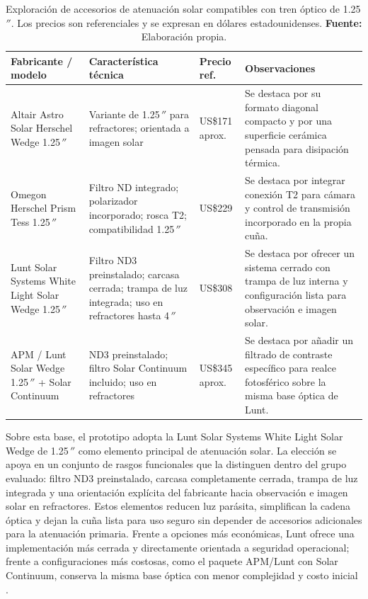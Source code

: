 \begin{table}[H]
\centering
\caption{Exploración de accesorios de atenuación solar compatibles con tren óptico de 1.25\,$''$. Los precios son referenciales y se expresan en dólares estadounidenses. \textbf{Fuente:} Elaboración propia.}
\label{tab:comparacion_filtros_proyecto}
\uniformtablestyle
\begin{tabularx}{\textwidth}{>{\raggedright\arraybackslash}p{3.35cm} >{\raggedright\arraybackslash}p{3.15cm} >{\centering\arraybackslash}p{1.45cm} X}
\toprule
\textbf{Fabricante / modelo} & \textbf{Característica técnica} & \textbf{Precio ref.} & \textbf{Observaciones} \\
\midrule
Altair Astro Solar Herschel Wedge 1.25\,$''$ & Variante de 1.25\,$''$ para refractores; orientada a imagen solar & US\$171 aprox. & Se destaca por su formato diagonal compacto y por una superficie cerámica pensada para disipación térmica. \\
Omegon Herschel Prism Tess 1.25\,$''$ & Filtro ND integrado; polarizador incorporado; rosca T2; compatibilidad 1.25\,$''$ & US\$229 & Se destaca por integrar conexión T2 para cámara y control de transmisión incorporado en la propia cuña. \\
Lunt Solar Systems White Light Solar Wedge 1.25\,$''$ & Filtro ND3 preinstalado; carcasa cerrada; trampa de luz integrada; uso en refractores hasta 4\,$''$ & US\$308 & Se destaca por ofrecer un sistema cerrado con trampa de luz interna y configuración lista para observación e imagen solar. \\
APM / Lunt Solar Wedge 1.25\,$''$ + Solar Continuum & ND3 preinstalado; filtro Solar Continuum incluido; uso en refractores & US\$345 aprox. & Se destaca por añadir un filtrado de contraste específico para realce fotosférico sobre la misma base óptica de Lunt. \\
\bottomrule
\end{tabularx}
\end{table}

Sobre esta base, el prototipo adopta la Lunt Solar Systems White Light Solar Wedge de 1.25\,$''$ como elemento principal de atenuación solar. La elección se apoya en un conjunto de rasgos funcionales que la distinguen dentro del grupo evaluado: filtro ND3 preinstalado, carcasa completamente cerrada, trampa de luz integrada y una orientación explícita del fabricante hacia observación e imagen solar en refractores. Estos elementos reducen luz parásita, simplifican la cadena óptica y dejan la cuña lista para uso seguro sin depender de accesorios adicionales para la atenuación primaria. Frente a opciones más económicas, Lunt ofrece una implementación más cerrada y directamente orientada a seguridad operacional; frente a configuraciones más costosas, como el paquete APM/Lunt con Solar Continuum, conserva la misma base óptica con menor complejidad y costo inicial \citep{luntWhiteLightWedges2026,altairHerschelWedge2026,apmLuntContinuum2026}.

